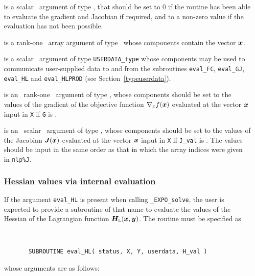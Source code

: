 \documentclass{galahad}
\newcommand{\packagename}{EXPO}
\newcommand{\fullpackagename}{\libraryname\_\packagename}
\newcommand{\solver}{{\tt \fullpackagename\_solve}}
\newcommand{\bmHL}{\bmH\sub{L}}
\begin{document}
\begin{description}
 is a scalar \intentout\ argument of type \integer,
that should be set to 0 if the routine has been able to evaluate
the gradient and Jacobian if required,
and to a non-zero value if the evaluation has not been possible.

 is a rank-one \intentin\ array argument of type \realdp\
whose components contain the vector ${\bm{x}}$.

 is a scalar \intentinout\ argument of type
{\tt USERDATA\_type} whose components may be used
to communicate user-supplied data to and from the
subroutines {\tt eval\_FC}, {\tt eval\_GJ},
{\tt eval\_HL} and {\tt eval\_HLPROD}
(see Section~\ref{typeuserdata}).

 is an \optional\ rank-one \intentout\ argument of type \realdp,
whose components should be set to the values of the gradient
of the objective function $\nabla_x f({\bm{x}})$
evaluated at the vector ${\bm{x}}$ input in {\tt X} if {\tt G} is \present.

 is an \optional\ scalar \intentout\ argument of type \realdp,
whose components should be set to the values of the Jacobian ${\bm{J}}({\bm{x}})$
evaluated at the vector ${\bm{x}}$ input in {\tt X} if {\tt J\_val} is \present.
The values should be input in the same order as that in which the array 
indices were given in {\tt nlp\%J}.

\end{description}


\subsubsection{Hessian values via internal evaluation\label{hfv}}

If the argument {\tt eval\_HL} is present when calling \solver, the
user is expected to provide a subroutine of that name to evaluate the
values of the Hessian of the Lagrangian function $\bmHL(\bmx,\bmy)$.
The routine must be specified as

\def\baselinestretch{0.8}
{\tt
\begin{verbatim}
       SUBROUTINE eval_HL( status, X, Y, userdata, H_val )
\end{verbatim} }
\def\baselinestretch{1.0}
\noindent whose arguments are as follows:
\end{document}
